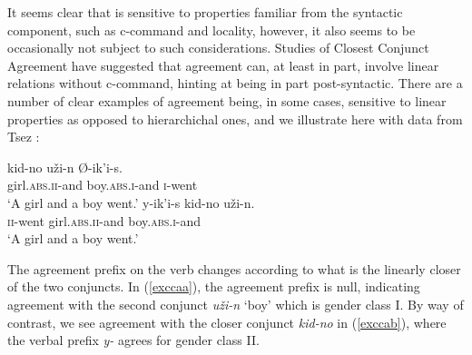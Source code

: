 \documentclass[output=paper
,modfonts
,nonflat]{langsci/langscibook}
\begin{document}
It seems clear that \agr {} is sensitive to properties familiar from the syntactic component, such as c-command and locality, however, it also seems to be occasionally not subject to such considerations. 
Studies of Closest Conjunct Agreement have suggested that agreement can, at least in part, involve linear relations without c-command, hinting at being in part post-syntactic.
There are a number of clear examples of agreement being, in some cases, sensitive to linear properties as opposed to hierarchichal ones, and we illustrate here with data from Tsez \citep{benmamounetal2009}:
\begin{exe}
	\ex
	\begin{xlist}
		\ex
		\gll kid-no u\v{z}i-n \O-ik'i-s.\\
		girl.\textsc{abs.ii}-and boy.\textsc{abs.i}-and \textsc{i}-went\\
		\glt `A girl and a boy went.' \label{exccaa}
		\ex
		\gll y-ik'i-s kid-no u\v{z}i-n.\\
		\textsc{ii}-went girl.\textsc{abs.ii}-and boy.\textsc{abs.i}-and\\
		\glt `A girl and a boy went.' \label{exccab}
	\end{xlist}
\end{exe}
The agreement prefix on the verb changes according to what is the linearly closer of the two conjuncts.
In (\ref{exccaa}), the agreement prefix is null, indicating agreement with the second conjunct \emph{u\v{z}i-n} `boy' which is gender class I.
By way of contrast, we see agreement with the closer conjunct \emph{kid-no} in (\ref{exccab}), where the verbal prefix \emph{y-} agrees for gender class II.
\end{document}
